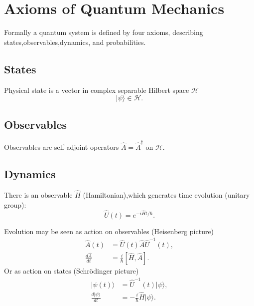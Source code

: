\chapter{Axioms of Quantum Mechanics}
\label{aqm}

Formally a quantum system is defined by four axioms,
describing states,observables,dynamics, and probabilities.
\section{States}
    \label{states}

\begin{axiom}[States]
    \label{sts}
Physical state is a vector in complex separable Hilbert space $ \mathcal{H} $
\[ |\psi \rangle \in \mathcal{H} .\]
\end{axiom}

\section{Observables}
    \label{observables}

\begin{axiom}[Observables]
    \label{observs}
Observables are self-adjoint operators $ \hat A= \hat A^\dagger$ on $\mathcal H$. 
\end{axiom}

\section{Dynamics}
    \label{dynamics}
\begin{axiom}[Dynamics]
    \label{dyn}
    There is an observable $ \hat H$ (Hamiltonian),which generates time evolution
    (unitary group):
    \begin{equation}
       \label {evol}
 \hat U(t) = e^{-i \hat Ht/\hbar}.
    \end{equation}
\end{axiom}

    Evolution may be seen as action on observables (Heisenberg picture)
\begin{align}
   \hat A(t)&= \hat U(t) \hat A \hat U^{-1}(t), \label {heis1}\\
    \frac{d \hat A}{d t} &= \frac{i}{\hbar}[\hat H,\hat A].\label{heis2}
\end{align}
    Or as action on states (Schr\"odinger picture)
\begin{align}
    |\psi(t)\rangle&= \hat U^{-1}(t) |\psi \rangle, \label{schr1} \\
    \frac{d |\psi \rangle}{d t} &=-\frac{i}{\hbar} \hat H |\psi \rangle. \label{schr2}
\end{align}


